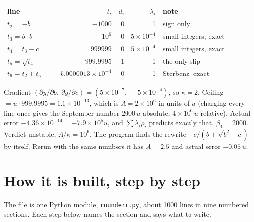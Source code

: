 \documentclass[11pt]{article}
\newcommand{\lam}{\lambda}
\begin{document}
\begin{good}[Worked numbers, the quadratic root $y = -b + \sqrt{b^2 - c}$ at $b = 1000$, $c = 1$]
\begin{center}
\begin{tabular}{@{}llrrrl@{}}
\toprule
line & & $t_i$ & $d_i$ & $\lam_i$ & note \\
\midrule
$t_2 = -b$ & & $-1000$ & 0 & 1 & sign only \\
$t_3 = b\cdot b$ & & $10^{6}$ & 0 & $5\times10^{-4}$ & small integers, exact \\
$t_4 = t_3 - c$ & & $999999$ & 0 & $5\times10^{-4}$ & small integers, exact \\
$t_5 = \sqrt{t_4}$ & & $999.9995$ & 1 & 1 & the only slip \\
$t_6 = t_2 + t_5$ & & $-5.0000013\times10^{-4}$ & 0 & 1 & Sterbenz, exact \\
\bottomrule
\end{tabular}
\end{center}
Gradient $(\partial y/\partial b,\ \partial y/\partial c) = (5\times10^{-7},\ -5\times10^{-4})$, so $\kappa = 2$. Ceiling $= u\cdot 999.9995 = 1.1\times10^{-13}$, which is $A = 2\times10^{6}$ in units of $u$ (charging every line once gives the September number $2000\,u$ absolute, $4\times10^{6}\,u$ relative). Actual error $-4.36\times10^{-14} = -7.9\times10^{5}u$, and $\sum\lam_i\rho_i$ predicts exactly that. $\beta_1 = 2000$. Verdict unstable, $A/\kappa = 10^{6}$. The program finds the rewrite $-c/(b+\sqrt{b^2-c})$ by itself. Rerun with the same numbers it has $A = 2.5$ and actual error $-0.05\,u$.
\end{good}

\section{How it is built, step by step}

The file is one Python module, \texttt{rounderr.py}, about 1000 lines in nine numbered sections. Each step below names the section and says what to write.
\end{document}

